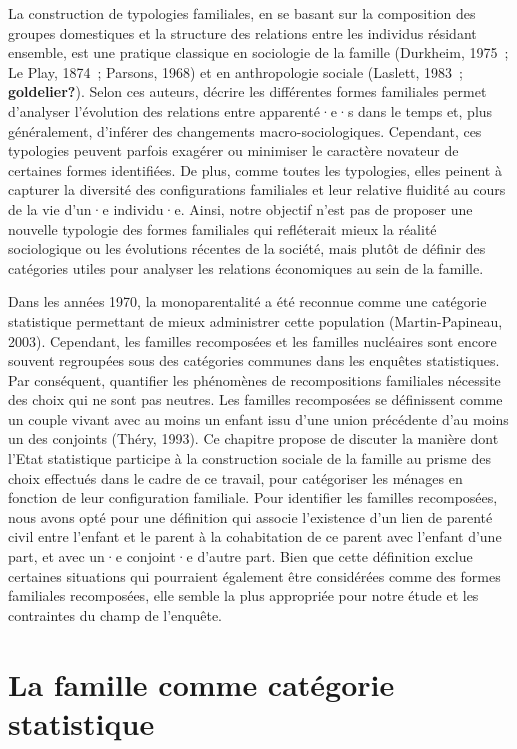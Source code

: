 \documentclass[
  12pt,
]{book}
\begin{document}
La construction de typologies familiales, en se basant sur la
composition des groupes domestiques et la structure des relations entre
les individus résidant ensemble, est une pratique classique en
sociologie de la famille (Durkheim, 1975~; Le Play, 1874~; Parsons,
1968) et en anthropologie sociale (Laslett, 1983~; \textbf{goldelier?}).
Selon ces auteurs, décrire les différentes formes familiales permet
d'analyser l'évolution des relations entre apparenté·e·s dans le temps
et, plus généralement, d'inférer des changements macro-sociologiques.
Cependant, ces typologies peuvent parfois exagérer ou minimiser le
caractère novateur de certaines formes identifiées. De plus, comme
toutes les typologies, elles peinent à capturer la diversité des
configurations familiales et leur relative fluidité au cours de la vie
d'un·e individu·e. Ainsi, notre objectif n'est pas de proposer une
nouvelle typologie des formes familiales qui refléterait mieux la
réalité sociologique ou les évolutions récentes de la société, mais
plutôt de définir des catégories utiles pour analyser les relations
économiques au sein de la famille.

Dans les années 1970, la monoparentalité a été reconnue comme une
catégorie statistique permettant de mieux administrer cette population
(Martin-Papineau, 2003). Cependant, les familles recomposées et les
familles nucléaires sont encore souvent regroupées sous des catégories
communes dans les enquêtes statistiques. Par conséquent, quantifier les
phénomènes de recompositions familiales nécessite des choix qui ne sont
pas neutres. Les familles recomposées se définissent comme un couple
vivant avec au moins un enfant issu d'une union précédente d'au moins un
des conjoints (Théry, 1993). Ce chapitre propose de discuter la manière
dont l'Etat statistique participe à la construction sociale de la
famille au prisme des choix effectués dans le cadre de ce travail, pour
catégoriser les ménages en fonction de leur configuration familiale.
Pour identifier les familles recomposées, nous avons opté pour une
définition qui associe l'existence d'un lien de parenté civil entre
l'enfant et le parent à la cohabitation de ce parent avec l'enfant d'une
part, et avec un·e conjoint·e d'autre part. Bien que cette définition
exclue certaines situations qui pourraient également être considérées
comme des formes familiales recomposées, elle semble la plus appropriée
pour notre étude et les contraintes du champ de l'enquête.

\section{La famille comme catégorie
statistique}\label{la-famille-comme-catuxe9gorie-statistique}
\end{document}
